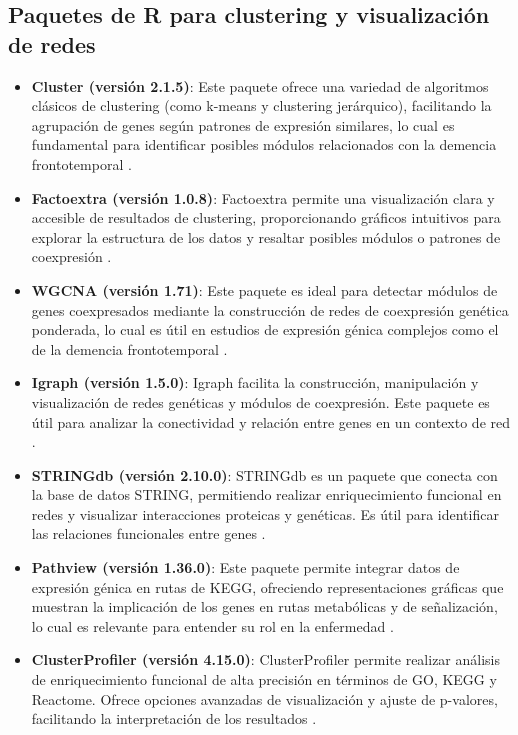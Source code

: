 \subsection*{Paquetes de R para clustering y visualización de redes}

\begin{itemize}
	\item \textbf{Cluster (versión 2.1.5)}: Este paquete ofrece una variedad de algoritmos clásicos de clustering (como k-means y clustering jerárquico), facilitando la agrupación de genes según patrones de expresión similares, lo cual es fundamental para identificar posibles módulos relacionados con la demencia frontotemporal \cite{cluster}.
	\item \textbf{Factoextra (versión 1.0.8)}: Factoextra permite una visualización clara y accesible de resultados de clustering, proporcionando gráficos intuitivos para explorar la estructura de los datos y resaltar posibles módulos o patrones de coexpresión \cite{factoextra}.
	\item \textbf{WGCNA (versión 1.71)}: Este paquete es ideal para detectar módulos de genes coexpresados mediante la construcción de redes de coexpresión genética ponderada, lo cual es útil en estudios de expresión génica complejos como el de la demencia frontotemporal \cite{wgcna}.
	\item \textbf{Igraph (versión 1.5.0)}: Igraph facilita la construcción, manipulación y visualización de redes genéticas y módulos de coexpresión. Este paquete es útil para analizar la conectividad y relación entre genes en un contexto de red \cite{igraph}.
	\item \textbf{STRINGdb (versión 2.10.0)}: STRINGdb es un paquete que conecta con la base de datos STRING, permitiendo realizar enriquecimiento funcional en redes y visualizar interacciones proteicas y genéticas. Es útil para identificar las relaciones funcionales entre genes \cite{stringdb}.
	\item \textbf{Pathview (versión 1.36.0)}: Este paquete permite integrar datos de expresión génica en rutas de KEGG, ofreciendo representaciones gráficas que muestran la implicación de los genes en rutas metabólicas y de señalización, lo cual es relevante para entender su rol en la enfermedad \cite{pathview}.
	\item \textbf{ClusterProfiler (versión 4.15.0)}: ClusterProfiler permite realizar análisis de enriquecimiento funcional de alta precisión en términos de GO, KEGG y Reactome. Ofrece opciones avanzadas de visualización y ajuste de p-valores, facilitando la interpretación de los resultados \cite{clusterprofiler}.
\end{itemize}

